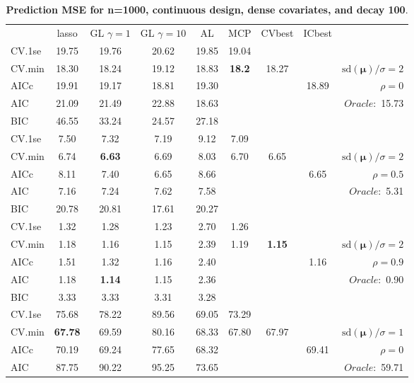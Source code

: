 \clearpage
\begin{table}\vspace{-.5cm}
\caption[l]{ { \bf Prediction MSE for n=1000, continuous design, 
dense covariates, and  decay  100}.}
\vspace{-.5cm}
\footnotesize{}
\begin{center}
\begin{tabular}{l*{7}{c}|r}
 & lasso & GL $\gamma=1$ & GL $\gamma=10$ & AL & MCP  & CVbest & ICbest  \\
\cline{1-9}
CV.1se & 19.75 & 19.76 & 20.62 & 19.85 & 19.04 & & & \\
CV.min & 18.30 & 18.24 & 19.12 & 18.83 & {\bf 18.2} & 18.27 & & $\mathrm{sd}(\mathbf{\mu})/\sigma=2$ \\
AICc & 19.91 & 19.17 & 18.81 & 19.30 & & & 18.89 &  $\rho=0$ \\
AIC & 21.09 & 21.49 & 22.88 & 18.63 & & & &  \multirow{2}{*}{$Oracle: $ 15.73} \\
BIC & 46.55 & 33.24 & 24.57 & 27.18 & & & &  \\
 \hline 
CV.1se & 7.50 & 7.32 & 7.19 & 9.12 & 7.09 & & & \\
CV.min & 6.74 & {\bf 6.63} & 6.69 & 8.03 & 6.70 & 6.65 & & $\mathrm{sd}(\mathbf{\mu})/\sigma=2$ \\
AICc & 8.11 & 7.40 & 6.65 & 8.66 & & & 6.65 &  $\rho=0.5$ \\
AIC & 7.16 & 7.24 & 7.62 & 7.58 & & & &  \multirow{2}{*}{$Oracle: $ 5.31} \\
BIC & 20.78 & 20.81 & 17.61 & 20.27 & & & &  \\
 \hline 
CV.1se & 1.32 & 1.28 & 1.23 & 2.70 & 1.26 & & & \\
CV.min & 1.18 & 1.16 & 1.15 & 2.39 & 1.19 & {\bf 1.15} & & $\mathrm{sd}(\mathbf{\mu})/\sigma=2$ \\
AICc & 1.51 & 1.32 & 1.16 & 2.40 & & & 1.16 &  $\rho=0.9$ \\
AIC & 1.18 & {\bf 1.14} & 1.15 & 2.36 & & & &  \multirow{2}{*}{$Oracle: $ 0.90} \\
BIC & 3.33 & 3.33 & 3.31 & 3.28 & & & &  \\
 \hline 
CV.1se & 75.68 & 78.22 & 89.56 & 69.05 & 73.29 & & & \\
CV.min & {\bf 67.78} & 69.59 & 80.16 & 68.33 & 67.80 & 67.97 & & $\mathrm{sd}(\mathbf{\mu})/\sigma=1$ \\
AICc & 70.19 & 69.24 & 77.65 & 68.32 & & & 69.41 &  $\rho=0$ \\
AIC & 87.75 & 90.22 & 95.25 & 73.65 & & & &  \multirow{2}{*}{$Oracle: $ 59.71} \\

\end{tabular}
\end{center}
\end{table}

